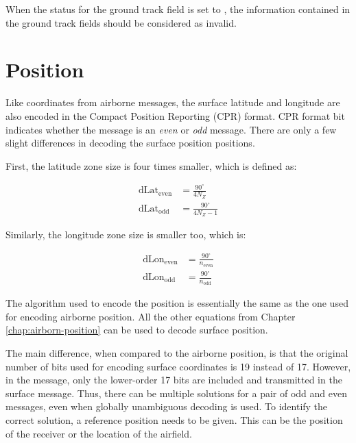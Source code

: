 When the status for the ground track field is set to \0, the information contained in the ground track fields should be considered as invalid.

\section{Position}

Like coordinates from airborne messages, the surface latitude and longitude are also encoded in the Compact Position Reporting (CPR) format. CPR format bit indicates whether the message is an \emph{even} or \emph{odd} message. There are only a few slight differences in decoding the surface position positions. 

First, the latitude zone size is four times smaller, which is defined as:

\begin{equation}
\begin{split}
    \mathrm{dLat}_\mathrm{even} &= \frac{90^\circ}{4 N_Z} \\
    \mathrm{dLat}_\mathrm{odd} &= \frac{90^\circ}{4 N_Z - 1}
\end{split}
\end{equation}

Similarly, the longitude zone size is smaller too, which is:

\begin{equation}
\begin{split}
    \mathrm{dLon}_\mathrm{even} &= \frac{90^\circ}{n_\mathrm{even}} \\
    \mathrm{dLon}_\mathrm{odd} &= \frac{90^\circ}{n_\mathrm{odd}}
\end{split}
\end{equation}

The algorithm used to encode the position is essentially the same as the one used for encoding airborne position. All the other equations from Chapter \ref{chap:airborn-position} can be used to decode surface position.

The main difference, when compared to the airborne position, is that the original number of bits used for encoding surface coordinates is 19 instead of 17. However, in the message, only the lower-order 17 bits are included and transmitted in the surface message. Thus, there can be multiple solutions for a pair of odd and even messages, even when globally unambiguous decoding is used. To identify the correct solution, a reference position needs to be given. This can be the position of the receiver or the location of the airfield.

